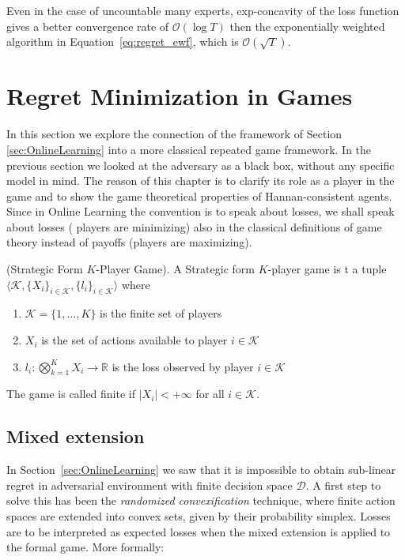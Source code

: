Even in the case of uncountable many experts, exp-concavity of the loss function gives a better convergence rate of $\mathcal O(\log T)$ then the exponentially weighted algorithm in Equation~\eqref{eq:regret_ewf}, which is $\mathcal O(\sqrt T)$.

\section{Regret Minimization in Games}
\label{sec:GT}
In this section we explore the connection of the framework of Section \ref{sec:OnlineLearning} into a more classical repeated game framework. In the previous section we looked at the adversary as a black box, without any specific model in mind. The reason of this chapter is to clarify its role as a player in the game and to show the game theoretical properties of Hannan-consistent agents. Since in Online Learning the convention is to speak about losses, we shall speak about losses ( players are minimizing) also in the classical definitions of game theory instead of payoffs (players are maximizing).

\begin{definition}(Strategic Form $K$-Player Game).\label{def:Game}
    A Strategic form $K$-player game is t a tuple $\langle\mathcal K,\{X_i\}_{i\in\mathcal K},\{l_i\}_{i\in\mathcal K}\rangle$ where
    \begin{enumerate}
        \item $\mathcal K=\{1,\ldots,K\}$ is the finite set of players
        \item $X_i$ is the set of actions available to player $i\in\mathcal K$
        \item $l_i:\bigotimes\limits_{k=1}^KX_i\to\mathbb R$ is the loss observed by player $i\in\mathcal K$
    \end{enumerate}
	The game is called finite if $|X_i|<+\infty$ for all $i\in\mathcal K$.
\end{definition}


\subsection{Mixed extension}\label{sec:mixed}
In Section~\ref{sec:OnlineLearning} we saw that it is impossible to obtain sub-linear regret in adversarial environment with finite decision space $\mathcal D$. A first step to solve this has been the \emph{randomized convexification} technique, where finite action spaces are extended into convex sets, given by their probability simplex. Losses are to be interpreted as expected losses when the mixed extension is applied to the formal game. More formally: 


